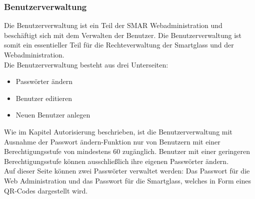 \subsubsection{Benutzerverwaltung}
Die Benutzerverwaltung ist ein Teil der \acs{SMAR} Webadministration und beschäftigt sich mit dem Verwalten der Benutzer. Die Benutzerverwaltung ist somit ein essentieller Teil für die Rechteverwaltung der Smartglass und der Webadministration.\\

Die Benutzerverwaltung besteht aus drei Unterseiten:
\begin{itemize}
	\item Passwörter ändern
	\item Benutzer editieren
	\item Neuen Benutzer anlegen
\end{itemize}
Wie im Kapitel Autorisierung beschrieben, ist die Benutzerverwaltung mit Ausnahme der \glqq Passwort ändern\grqq -Funktion nur von Benutzern mit einer Berechtigungsstufe von mindestens 60 zugänglich. Benutzer mit einer geringeren Berechtigungsstufe können ausschließlich ihre eigenen Passwörter ändern.\\

Auf dieser Seite können zwei Passwörter verwaltet werden: Das Passwort für die Web Administration und das Passwort für die Smartglass, welches in Form eines QR-Codes dargestellt wird.\\

